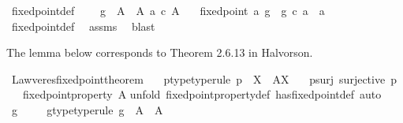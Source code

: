 \begin{isabellebody}
\isanewline
{}\isamarkupfalse%
\ fixed{\isacharunderscore}{\kern0pt}point{\isacharunderscore}{\kern0pt}def{}{\isacharcolon}{\kern0pt}\ \isanewline
\ \ \ {\isachardoublequoteopen}g\ {\isacharcolon}{\kern0pt}\ A\ {\isasymrightarrow}\ A{\isachardoublequoteclose}\ {\isachardoublequoteopen}a\ {\isasymin}\isactrlsub c\ A{\isachardoublequoteclose}\isanewline
\ \ \ {\isachardoublequoteopen}fixed{\isacharunderscore}{\kern0pt}point\ a\ g\ {\isacharequal}{\kern0pt}\ {\isacharparenleft}{\kern0pt}g\ {\isasymcirc}\isactrlsub c\ a\ {\isacharequal}{\kern0pt}\ a{\isacharparenright}{\kern0pt}{\isachardoublequoteclose}\isanewline
%
\isadelimproof
\ \ %
\endisadelimproof
%
\isatagproof
{}\isamarkupfalse%
\ fixed{\isacharunderscore}{\kern0pt}point{\isacharunderscore}{\kern0pt}def\ \isamarkupfalse%
\ assms\ \isamarkupfalse%
\ blast%
\endisatagproof
{\isafoldproof}%
%
\isadelimproof
%
\endisadelimproof
%
\begin{isamarkuptext}%
The lemma below corresponds to Theorem 2.6.13 in Halvorson.%
\end{isamarkuptext}\isamarkuptrue%
\isamarkupfalse%
\ Lawveres{\isacharunderscore}{\kern0pt}fixed{\isacharunderscore}{\kern0pt}point{\isacharunderscore}{\kern0pt}theorem{\isacharcolon}{\kern0pt}\isanewline
\ \ \ p{\isacharunderscore}{\kern0pt}type{\isacharbrackleft}{\kern0pt}type{\isacharunderscore}{\kern0pt}rule{\isacharbrackright}{\kern0pt}{\isacharcolon}{\kern0pt}\ {\isachardoublequoteopen}p\ {\isacharcolon}{\kern0pt}\ X\ {\isasymrightarrow}\ A\isactrlbsup X\isactrlesup {\isachardoublequoteclose}\isanewline
\ \ \ p{\isacharunderscore}{\kern0pt}surj{\isacharcolon}{\kern0pt}\ {\isachardoublequoteopen}surjective\ p{\isachardoublequoteclose}\isanewline
\ \ \ {\isachardoublequoteopen}fixed{\isacharunderscore}{\kern0pt}point{\isacharunderscore}{\kern0pt}property\ A{\isachardoublequoteclose}\isanewline
%
\isadelimproof
%
\endisadelimproof
%
\isatagproof
{}\isamarkupfalse%
{\isacharparenleft}{\kern0pt}unfold\ fixed{\isacharunderscore}{\kern0pt}point{\isacharunderscore}{\kern0pt}property{\isacharunderscore}{\kern0pt}def\ has{\isacharunderscore}{\kern0pt}fixed{\isacharunderscore}{\kern0pt}point{\isacharunderscore}{\kern0pt}def\ {\isacharcomma}{\kern0pt}auto{\isacharparenright}{\kern0pt}\ \isanewline
\ \ \isamarkupfalse%
\ g\ \isanewline
\ \ \isamarkupfalse%
\ g{\isacharunderscore}{\kern0pt}type{\isacharbrackleft}{\kern0pt}type{\isacharunderscore}{\kern0pt}rule{\isacharbrackright}{\kern0pt}{\isacharcolon}{\kern0pt}\ {\isachardoublequoteopen}g\ {\isacharcolon}{\kern0pt}\ A\ {\isasymrightarrow}\ A{\isachardoublequoteclose}\isanewline

\end{isabellebody}
